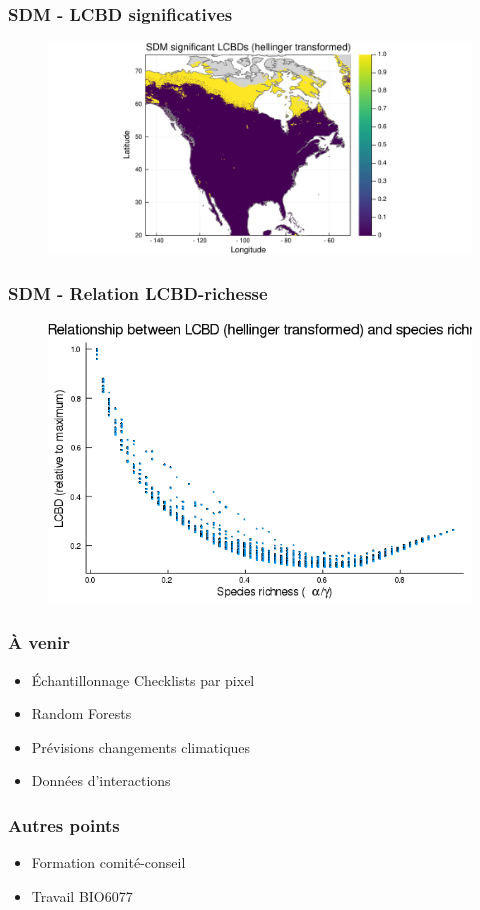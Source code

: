 \documentclass[10pt]{beamer}
\begin{document}
\begin{frame}
  \frametitle{SDM - LCBD significatives}
  \begin{figure}
    \centering
    \hspace*{-2cm}\includegraphics[scale=0.5]{fig/sdm-lcbd-signif.pdf}
  \end{figure}
\end{frame}

\begin{frame}
  \frametitle{SDM - Relation LCBD-richesse}
  \begin{figure}
    \centering
    \hspace*{-2cm}\includegraphics[scale=0.5]{fig/sdm-relation-lcbd-richness-transf.png}
  \end{figure}
\end{frame}

\begin{frame}
  \frametitle{À venir}
  \begin{itemize}
    \item Échantillonnage Checklists par pixel
    \item Random Forests
    \item Prévisions changements climatiques
    \item Données d'interactions
  \end{itemize}
\end{frame}

\begin{frame}
  \frametitle{Autres points}
  \begin{itemize}
    \item Formation comité-conseil
    \item Travail BIO6077
  \end{itemize}
\end{frame}
\end{document}
